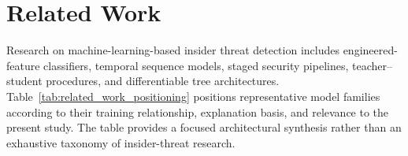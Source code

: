 \section{Related Work}
\label{sec:related_work}
Research on machine-learning-based insider threat detection includes
engineered-feature classifiers, temporal sequence models, staged security
pipelines, teacher--student procedures, and differentiable tree
architectures. Table~\ref{tab:related_work_positioning} positions
representative model families according to their training relationship,
explanation basis, and relevance to the present study. The table provides a
focused architectural synthesis rather than an exhaustive taxonomy of
insider-threat research.

